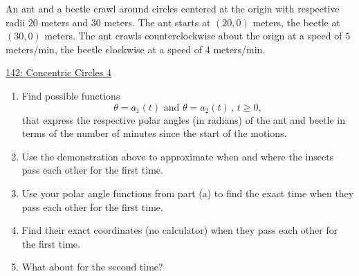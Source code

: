 \documentclass{ximera}
\begin{document}
\begin{question} \label{Q43fg4tggfr}
An ant and a beetle crawl around circles centered at the origin with respective radii $20$ meters and $30$ meters.  The ant starts at $(20,0)$ meters, the beetle at $(30,0)$ meters. The ant crawls counterclockwise about the orign at a speed of $5$ meters/min, the beetle clockwise at a speed of $4$ meters/min. 

\begin{onlineOnly}
    \begin{center}
\end{center}
\end{onlineOnly}

\href{https://www.desmos.com/calculator/ie75j2a9ky}{142: Concentric Circles 4}

\begin{enumerate}

\item Find possible functions
\[
   \theta = a_1(t) \text{ and } \theta = a_2(t) \, , \, t\geq 0 ,
\]
that express the respective polar angles (in radians) of the ant and beetle in terms of the number of minutes since the start of the motions.

\item Use the demonstration above to approximate when and where the insects pass each other for the first time.

\item Use your polar angle functions from part (a) to find the exact time when they pass each other for the first time.


\item Find their exact coordinates (no calculator) when they pass each other for the first time.

\item What about for the second time?
\end{enumerate}
\end{question}
\end{document}
